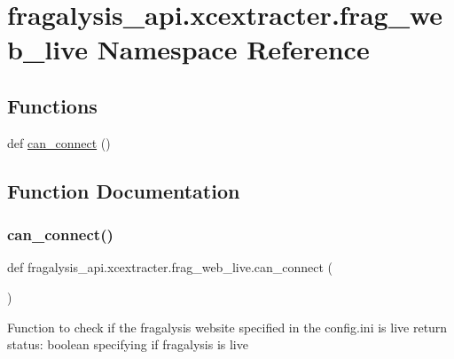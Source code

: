 \hypertarget{namespacefragalysis__api_1_1xcextracter_1_1frag__web__live}{}\section{fragalysis\+\_\+api.\+xcextracter.\+frag\+\_\+web\+\_\+live Namespace Reference}
\label{namespacefragalysis__api_1_1xcextracter_1_1frag__web__live}
\subsection*{Functions}
\begin{DoxyCompactItemize}
\item 
def \hyperlink{namespacefragalysis__api_1_1xcextracter_1_1frag__web__live_a0c358bb08db16e67b947ea3e06a2516c}{can\+\_\+connect} ()
\end{DoxyCompactItemize}


\subsection{Function Documentation}
\mbox{\label{namespacefragalysis__api_1_1xcextracter_1_1frag__web__live_a0c358bb08db16e67b947ea3e06a2516c}} 
\subsubsection{\texorpdfstring{can\+\_\+connect()}{can\_connect()}}
{\footnotesize\ttfamily def fragalysis\+\_\+api.\+xcextracter.\+frag\+\_\+web\+\_\+live.\+can\+\_\+connect (\begin{DoxyParamCaption}{ }\end{DoxyParamCaption})}

\begin{DoxyVerb}Function to check if the fragalysis website specified in the config.ini is live
return status: boolean specifying if fragalysis is live
\end{DoxyVerb}
 

